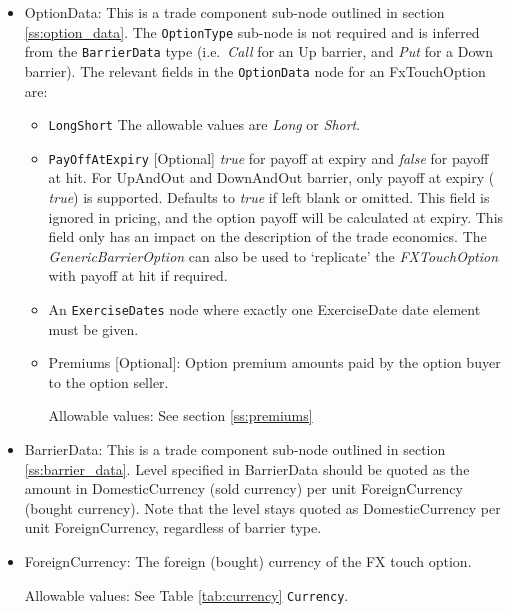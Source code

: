 \begin{itemize}

\item OptionData: This is a trade component sub-node outlined in section \ref{ss:option_data}. The \lstinline!OptionType! sub-node
is not required and is inferred from the \lstinline!BarrierData! type (i.e.\ \emph{Call} for an Up barrier, and \emph{Put} for a Down barrier).
The relevant fields in the \lstinline!OptionData! node for an FxTouchOption are:

\begin{itemize}
\item \lstinline!LongShort! The allowable values are \emph{Long} or \emph{Short}.

\item  \lstinline!PayOffAtExpiry! [Optional] \emph{true} for payoff at expiry and \emph{false} for payoff at hit.
For UpAndOut and DownAndOut barrier, only payoff at expiry ( \emph{true}) is supported. Defaults to  \emph{true} if left blank or omitted. This field is ignored in pricing, and the option payoff will be calculated at expiry. This field only has an impact on the description of the trade economics. The \emph{GenericBarrierOption} can also be used to `replicate' the \emph{FXTouchOption} with payoff at hit if required.

\item An \lstinline!ExerciseDates! node where exactly one ExerciseDate date element must be given.

\item Premiums [Optional]: Option premium amounts paid by the option buyer to the option seller.

Allowable values:  See section \ref{ss:premiums}

\end{itemize}

\item BarrierData: This is a trade component sub-node outlined in section \ref{ss:barrier_data}.
Level specified in BarrierData should be quoted as the amount in DomesticCurrency (sold currency) per unit ForeignCurrency (bought currency). Note that the level stays quoted as DomesticCurrency per unit ForeignCurrency, regardless of barrier type.

\item ForeignCurrency: The foreign (bought) currency of the FX touch option.  

Allowable values:  See Table \ref{tab:currency} \lstinline!Currency!.


\end{itemize}

